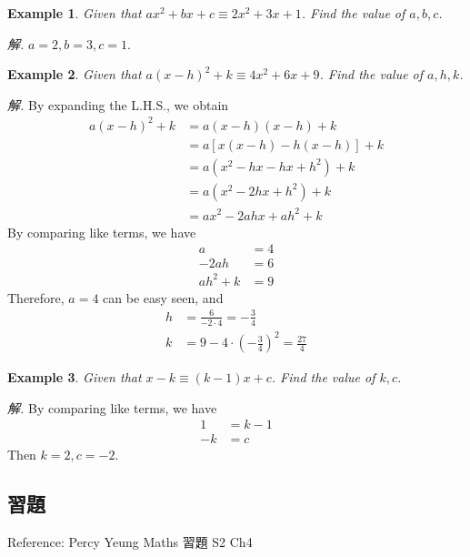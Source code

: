 \documentclass[12pt]{article}
\newtheorem{example}{Example}
\begin{document}
    \begin{example}
        Given that $ax^2+bx+c\equiv 2x^2+3x+1$. Find the value of $a,b,c$.
    \end{example}

    \textit{ 解.} $a=2, b=3, c=1$.

    \begin{example}
        Given that $a(x-h)^2+k\equiv 4x^2+6x+9$. Find the value of $a,h,k$.
    \end{example}

    \textit{ 解.} By expanding the L.H.S., we obtain\begin{align*}
        a(x-h)^2+k&=a(x-h)(x-h)+k\\
        &=a[x(x-h)-h(x-h)]+k\\
        &=a(x^2-hx-hx+h^2)+k\\
        &=a(x^2-2hx+h^2)+k\\
        &=ax^2-2ahx+ah^2+k
    \end{align*}
    By comparing like terms, we have\begin{align*}
        a&=4\\
        -2ah&=6\\
        ah^2+k&=9
    \end{align*}
    Therefore, $a=4$ can be easy seen, and \begin{align*}
        h&=\frac{6}{-2\cdot 4}=-\frac{3}{4}\\
        k&=9-4\cdot (-\frac{3}{4})^2=\frac{27}{4}
    \end{align*}

    \begin{example}
        Given that $x-k\equiv (k-1)x+c$. Find the value of $k,c$.
    \end{example}

    \textit{ 解.} By comparing like terms, we have\begin{align*}
        1&=k-1\\
        -k&=c
    \end{align*} Then $k=2,c=-2$.

    \subsection*{習題}
    Reference: Percy Yeung Maths 習題 S2 Ch4
    
\end{document}
